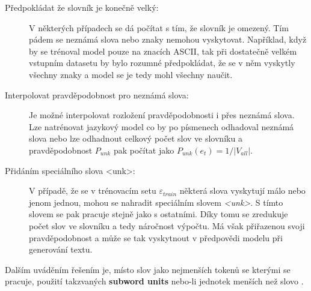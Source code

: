 \begin{description}
  \item[Předpokládat že slovník je konečně velký:] V některých případech se dá počítat s tím, že slovník je omezený. Tím pádem se neznámá slova nebo znaky nemohou vyskytovat. Například, když by se trénoval model pouze na znacích ASCII, tak při dostatečně velkém vstupním datasetu by bylo rozumné předpokládat, že se v něm vyskytly všechny znaky a model se je tedy mohl všechny naučit.
  \item[Interpolovat pravděpodobnost pro neznámá slova:] Je možné interpolovat rozložení pravděpodobnosti i přes neznámá slova. Lze natrénovat jazykový model co by po písmenech odhadoval neznámá slova nebo lze odhadnout celkový počet slov ve slovníku a pravděpodobnost $P_{unk}$ pak počítat jako $P_{unk}(e_t) = 1/|V_{all}|$.
  \item[Přidáním speciálního slova <unk>:]\label{description:unk}V případě, že se v trénovacím setu $\varepsilon_{train}$ některá slova vyskytují málo nebo jenom jednou, mohou se nahradit speciálním slovem \emph{<unk>}. S tímto slovem se pak pracuje stejně jako s ostatními. Díky tomu se zredukuje počet slov ve slovníku a tedy náročnost výpočtu. Má však přiřazenou svoji pravděpodobnost a může se tak vyskytnout v předpovědi modelu při generování textu.
\end{description}

Dalším uváděním řešením je, místo slov jako nejmenších tokenů se kterými se pracuje, použití takzvaných \textbf{subword units} nebo-li jednotek menších než slovo \cite{subwords}.


